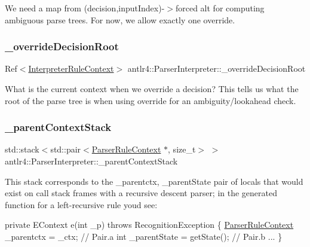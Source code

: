 We need a map from (decision,input\+Index)-\/$>$forced alt for computing ambiguous parse trees. For now, we allow exactly one override. \mbox{\label{classantlr4_1_1ParserInterpreter_a6380e8d9f1a250454fe1299845a57f6f}} 
\subsubsection{\texorpdfstring{\+\_\+override\+Decision\+Root}{\_overrideDecisionRoot}}
{\footnotesize\ttfamily Ref$<$\hyperlink{classantlr4_1_1InterpreterRuleContext}{Interpreter\+Rule\+Context}$>$ antlr4\+::\+Parser\+Interpreter\+::\+\_\+override\+Decision\+Root\hspace{0.3cm}{\ttfamily [protected]}}

What is the current context when we override a decision? This tells us what the root of the parse tree is when using override for an ambiguity/lookahead check. \mbox{\label{classantlr4_1_1ParserInterpreter_abfa9731e87e83124dd86ab5d001049d1}} 
\subsubsection{\texorpdfstring{\+\_\+parent\+Context\+Stack}{\_parentContextStack}}
{\footnotesize\ttfamily std\+::stack$<$std\+::pair$<$\hyperlink{classantlr4_1_1ParserRuleContext}{Parser\+Rule\+Context} $\ast$, size\+\_\+t$>$ $>$ antlr4\+::\+Parser\+Interpreter\+::\+\_\+parent\+Context\+Stack\hspace{0.3cm}{\ttfamily [protected]}}

This stack corresponds to the \+\_\+parentctx, \+\_\+parent\+State pair of locals that would exist on call stack frames with a recursive descent parser; in the generated function for a left-\/recursive rule you\textquotesingle{}d see\+:

private E\+Context e(int \+\_\+p) throws Recognition\+Exception \{ \hyperlink{classantlr4_1_1ParserRuleContext}{Parser\+Rule\+Context} \+\_\+parentctx = \+\_\+ctx; // Pair.\+a int \+\_\+parent\+State = get\+State(); // Pair.\+b ... \}

